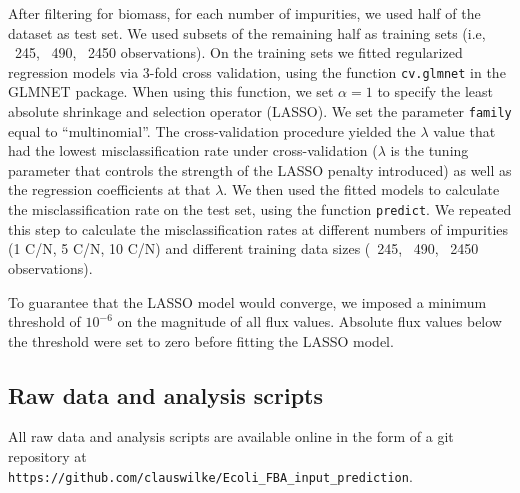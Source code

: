 \documentclass[12pt]{article}
\begin{document}
After filtering for biomass, for each number of impurities, we used half of the dataset as test set. We used subsets of the remaining half as training sets (i.e, ~245, ~490, ~2450 observations). On the training sets we fitted regularized regression models via 3-fold cross validation, using the function \texttt{cv.glmnet} in the GLMNET package. When using this function, we set $\alpha=1$ to specify the least absolute shrinkage and selection operator (LASSO). We set the parameter \texttt{family} equal to ``multinomial''. The cross-validation procedure yielded the  $\lambda$ value that had the lowest misclassification rate under cross-validation ($\lambda$ is the tuning parameter that controls the strength of the LASSO penalty introduced) as well as the regression coefficients at that $\lambda$. We then used the fitted models to calculate the misclassification rate on the test set, using the function \texttt{predict}. We repeated this step to calculate the misclassification rates at different numbers of impurities (1 C/N, 5 C/N, 10 C/N) and different training data sizes (~245, ~490, ~2450 observations).

To guarantee that the LASSO model would converge, we imposed a minimum threshold of $10^{-6}$ on the magnitude of all flux values. Absolute flux values below the threshold were set to zero before fitting the LASSO model.

\subsection{Raw data and analysis scripts}

All raw data and analysis scripts are available online in the form of a git repository at\\ \texttt{https://github.com/clauswilke/Ecoli\_FBA\_input\_prediction}.


\end{document}
